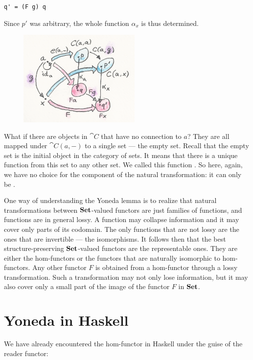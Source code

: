\begin{Verbatim}
q' = (F g) q
\end{Verbatim}
Since $p'$ was arbitrary, the whole function $α_x$ is
thus determined.

\begin{figure}[H]
\centering
\includegraphics[width=60mm]{images/yoneda5.png}
\end{figure}

\noindent
What if there are objects in $\cat{C}$ that have no connection to
$a$? They are all mapped under $\cat{C}(a, -)$ to a single set
--- the empty set. Recall that the empty set is the initial object in
the category of sets. It means that there is a unique function from this
set to any other set. We called this function . So here,
again, we have no choice for the component of the natural
transformation: it can only be .

One way of understanding the Yoneda lemma is to realize that natural
transformations between $\mathbf{Set}$-valued functors are just families
of functions, and functions are in general lossy. A function may
collapse information and it may cover only parts of its codomain. The
only functions that are not lossy are the ones that are invertible ---
the isomorphisms. It follows then that the best structure-preserving
$\mathbf{Set}$-valued functors are the representable ones. They are either
the hom-functors or the functors that are naturally isomorphic to
hom-functors. Any other functor $F$ is obtained from a
hom-functor through a lossy transformation. Such a transformation may
not only lose information, but it may also cover only a small part of
the image of the functor $F$ in $\mathbf{Set}$.

\section{Yoneda in Haskell}\label{yoneda-in-haskell}

We have already encountered the hom-functor in Haskell under the guise
of the reader functor:

